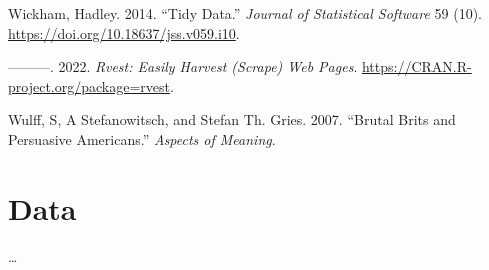 \documentclass[
  letterpaper,
]{latex/krantz}
\newlength{\cslhangindent}
\newlength{\cslentryspacingunit} %
\newenvironment{CSLReferences}[2] %
 {%
  \setlength{\parindent}{0pt}
  \ifodd #1
  \let\oldpar\par
  \def\par{\hangindent=\cslhangindent\oldpar}
  \fi
  \setlength{\parskip}{#2\cslentryspacingunit}
 }%
 {}
\begin{document}
\begin{CSLReferences}{1}{0}
\leavevmode{}%
Wickham, Hadley. 2014. {``Tidy Data.''} \emph{Journal of Statistical
Software} 59 (10). \url{https://doi.org/10.18637/jss.v059.i10}.

\leavevmode{}%
---------. 2022. \emph{Rvest: Easily Harvest (Scrape) Web Pages}.
\url{https://CRAN.R-project.org/package=rvest}.

\leavevmode{}%
Wulff, S, A Stefanowitsch, and Stefan Th. Gries. 2007. {``Brutal Brits
and Persuasive Americans.''} \emph{Aspects of Meaning}.

\end{CSLReferences}

\appendix
{}

\hypertarget{data-appendix}{%
\chapter{Data}\label{data-appendix}}

\ldots{}



\printindex
\end{document}
